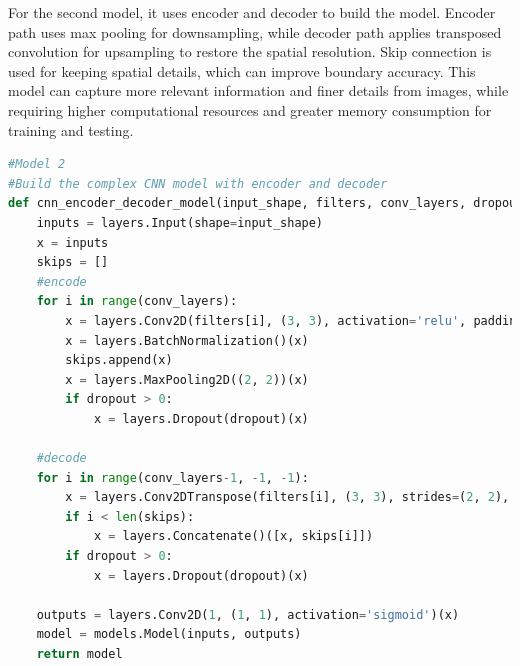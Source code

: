 For the second model, it uses encoder and decoder to build the model. Encoder path uses max pooling for downsampling, while decoder path applies transposed convolution for upsampling to restore the spatial resolution. Skip connection is used for keeping spatial details, which can improve boundary accuracy. This model can capture more relevant information and finer details from images, while requiring higher computational resources and greater memory consumption for training and testing. 

\begin{lstlisting}[language=Python]
#Model 2
#Build the complex CNN model with encoder and decoder
def cnn_encoder_decoder_model(input_shape, filters, conv_layers, dropout):
    inputs = layers.Input(shape=input_shape)
    x = inputs
    skips = []
    #encode
    for i in range(conv_layers):
        x = layers.Conv2D(filters[i], (3, 3), activation='relu', padding='same')(x)
        x = layers.BatchNormalization()(x)
        skips.append(x)
        x = layers.MaxPooling2D((2, 2))(x)
        if dropout > 0:
            x = layers.Dropout(dropout)(x)

    #decode
    for i in range(conv_layers-1, -1, -1):
        x = layers.Conv2DTranspose(filters[i], (3, 3), strides=(2, 2), activation='relu', padding='same')(x)
        if i < len(skips):
            x = layers.Concatenate()([x, skips[i]])
        if dropout > 0:
            x = layers.Dropout(dropout)(x)

    outputs = layers.Conv2D(1, (1, 1), activation='sigmoid')(x)
    model = models.Model(inputs, outputs)
    return model
\end{lstlisting}


